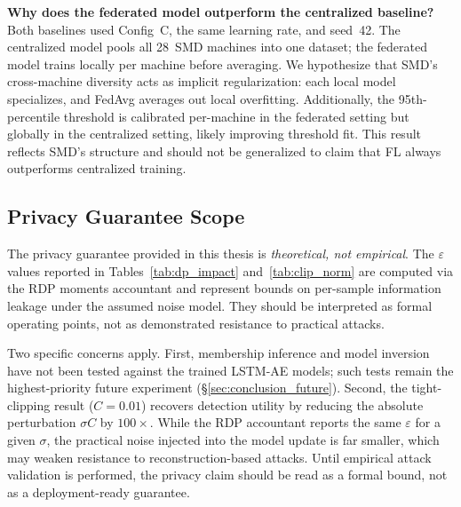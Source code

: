 \textbf{Why does the federated model outperform the centralized baseline?}
Both baselines used Config~C, the same learning rate, and seed~42. The
centralized model pools all 28~SMD machines into one dataset; the federated
model trains locally per machine before averaging. We hypothesize that SMD's
cross-machine diversity acts as implicit regularization: each local model
specializes, and FedAvg averages out local overfitting. Additionally, the
95th-percentile threshold is calibrated per-machine in the federated setting but
globally in the centralized setting, likely improving threshold fit. This
result reflects SMD's structure and should not be generalized to claim that FL
always outperforms centralized training.

\subsection{Privacy Guarantee Scope}
\label{subsec:privacy_scope}

The privacy guarantee provided in this thesis is \emph{theoretical, not
empirical}. The $\varepsilon$ values reported in Tables~\ref{tab:dp_impact}
and~\ref{tab:clip_norm} are computed via the RDP moments accountant and
represent bounds on per-sample information leakage under the assumed noise
model. They should be interpreted as formal operating points, not as
demonstrated resistance to practical attacks.

Two specific concerns apply. First, membership inference
\cite{shokri2017membership} and model inversion \cite{fredrikson2015model}
have not been tested against the trained LSTM-AE models; such tests remain the
highest-priority future experiment (\S\ref{sec:conclusion_future}). Second, the
tight-clipping result ($C{=}0.01$) recovers detection utility by reducing the
absolute perturbation $\sigma C$ by $100\times$. While the RDP accountant
reports the same $\varepsilon$ for a given $\sigma$, the practical noise
injected into the model update is far smaller, which may weaken resistance to
reconstruction-based attacks. Until empirical attack validation is performed,
the privacy claim should be read as a formal bound, not as a deployment-ready
guarantee.
